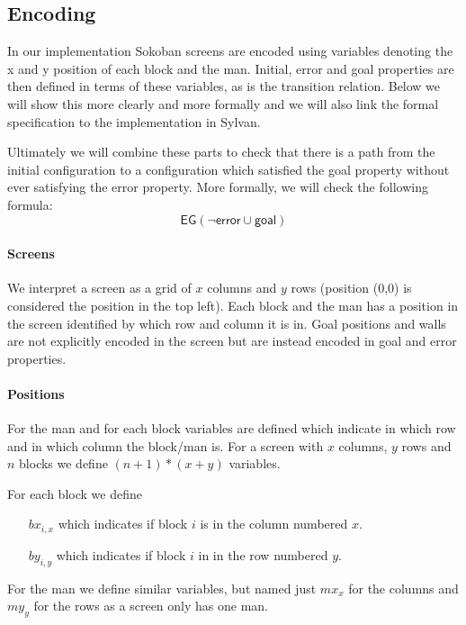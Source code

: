 \subsection{Encoding} \label{sec:encoding}
In our implementation Sokoban screens are encoded using variables denoting the
x and y position of each block and the man. Initial, error and goal properties
are then defined in terms of these variables, as is the transition relation. 
Below we will show this more 
clearly and more formally and we will also link the formal specification to the
implementation in Sylvan.

Ultimately we will combine these parts to check that there is a path from the
initial configuration to a configuration which satisfied the goal property 
without ever satisfying the error property. More formally, we will check the
following formula:
\begin{equation}\label{eq:eg_end}
	\mathsf{EG (\neg error \cup goal)}
\end{equation}

\paragraph{Screens} We interpret a screen as a grid of $x$ columns and $y$ rows
(position (0,0) is considered the position in the top left).
Each block and the man has a position in the screen identified by which row and
column it is in. Goal positions and walls are not explicitly encoded in the 
screen but are instead encoded in goal and error properties.

\paragraph{Positions} For the man and for each block variables are defined which
indicate in which row and in which column the block/man is. For a screen with
$x$ columns, $y$ rows and $n$ blocks we define $(n+1)*(x+y)$ 
variables. 

For each block we define
\begin{itemize}
	\item[$bx_{i,x}$] which indicates if block $i$ is in the column numbered $x$.
	\item[$by_{i,y}$] which indicates if block $i$ in in the row numbered $y$.
\end{itemize}
For the man we define similar variables, but named just $mx_x$ for the columns
and $my_y$ for the rows as a screen only has one man.


